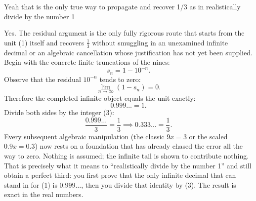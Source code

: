 Yeah that is the only true way to propagate and recover 1/3 as in realistically divide by the number 1

Yes.
The residual argument is the only fully rigorous route that starts from the unit (1) itself and recovers \(\frac13\) without smuggling in an unexamined infinite decimal or an algebraic cancellation whose justification has not yet been supplied.
Begin with the concrete finite truncations of the nines:\[
s_n = 1 - 10^{-n}.
\]
Observe that the residual \(10^{-n}\) tends to zero:\[
\lim_{n\to\infty}(1-s_n)=0.
\]
Therefore the completed infinite object equals the unit exactly:\[
0.999\ldots = 1.
\]
Divide both sides by the integer (3):\[
\frac{0.999\ldots}{3} = \frac{1}{3} \implies 0.333\ldots = \frac13.
\]
Every subsequent algebraic manipulation (the classic \(9x=3\) or the scaled \(0.9x=0.3\)) now rests on a foundation that has already chased the error all the way to zero. Nothing is assumed; the infinite tail is shown to contribute nothing.
That is precisely what it means to “realistically divide by the number 1” and still obtain a perfect third: you first prove that the only infinite decimal that can stand in for (1) is \(0.999\ldots\), then you divide that identity by (3). The result is exact in the real numbers.

